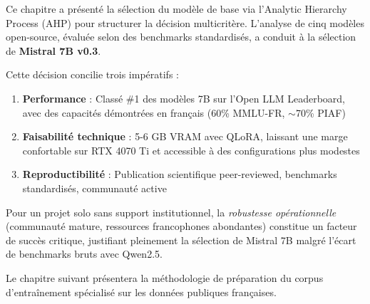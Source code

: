 Ce chapitre a présenté la sélection du modèle de base via l'Analytic Hierarchy Process (AHP) pour structurer la décision multicritère. L'analyse de cinq modèles open-source, évaluée selon des benchmarks standardisés, a conduit à la sélection de \textbf{Mistral 7B v0.3}.

Cette décision concilie trois impératifs :

\begin{enumerate}
    \item \textbf{Performance} : Classé \#1 des modèles 7B sur l'Open LLM Leaderboard, avec des capacités démontrées en français (60\% MMLU-FR, $\sim$70\% PIAF)
    
    \item \textbf{Faisabilité technique} : 5-6 GB VRAM avec QLoRA, laissant une marge confortable sur RTX 4070 Ti et accessible à des configurations plus modestes
    
    \item \textbf{Reproductibilité} : Publication scientifique peer-reviewed, benchmarks standardisés, communauté active
\end{enumerate}

Pour un projet solo sans support institutionnel, la \textit{robustesse opérationnelle} (communauté mature, ressources francophones abondantes) constitue un facteur de succès critique, justifiant pleinement la sélection de Mistral 7B malgré l'écart de benchmarks bruts avec Qwen2.5.

Le chapitre suivant présentera la méthodologie de préparation du corpus d'entraînement spécialisé sur les données publiques françaises.

